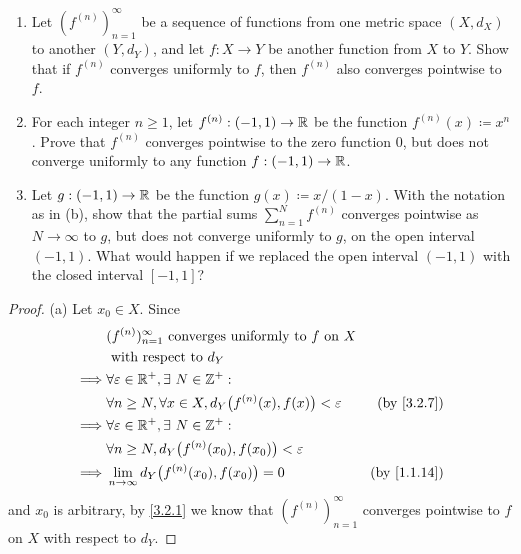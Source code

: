 \begin{ex}\label{ex:3.2.2}
  \quad
  \begin{enumerate}
    \item Let \((f^{(n)})_{n = 1}^\infty\) be a sequence of functions from one metric space \((X, d_X)\) to another \((Y, d_Y)\), and let \(f : X \to Y\) be another function from \(X\) to \(Y\).
          Show that if \(f^{(n)}\) converges uniformly to \(f\), then \(f^{(n)}\) also converges pointwise to \(f\).
    \item For each integer \(n \geq 1\), let \(f^{(n)} : (-1, 1) \to \mathbb{R}\) be the function \(f^{(n)}(x) \coloneqq x^n\).
          Prove that \(f^{(n)}\) converges pointwise to the zero function \(0\), but does not converge uniformly to any function \(f : (-1, 1) \to \mathbb{R}\).
    \item Let \(g : (-1, 1) \to \mathbb{R}\) be the function \(g(x) \coloneqq x / (1 - x)\).
          With the notation as in (b), show that the partial sums \(\sum_{n = 1}^N f^{(n)}\) converges pointwise as \(N \to \infty\) to \(g\), but does not converge uniformly to \(g\), on the open interval \((-1, 1)\).
          What would happen if we replaced the open interval \((-1, 1)\) with the closed interval \([-1, 1]\)?
  \end{enumerate}
\end{ex}

\begin{proof}{(a)}
  Let \(x_0 \in X\).
  Since
  \begin{align*}
             & (f^{(n)})_{n = 1}^\infty \text{ converges uniformly to } f \text{ on } X                                   \\
             & \text{ with respect to } d_Y                                                                               \\
    \implies & \forall \varepsilon \in \R^+, \exists\ N \in \Z^+ :                                                        \\
             & \forall n \geq N, \forall x \in X, d_Y\big(f^{(n)}(x), f(x)\big) < \varepsilon & \text{(by \cref{3.2.7})}  \\
    \implies & \forall \varepsilon \in \R^+, \exists\ N \in \Z^+ :                                                        \\
             & \forall n \geq N, d_Y\big(f^{(n)}(x_0), f(x_0)\big) < \varepsilon                                          \\
    \implies & \lim_{n \to \infty} d_Y\big(f^{(n)}(x_0), f(x_0)\big) = 0                      & \text{(by \cref{1.1.14})}
  \end{align*}
  and \(x_0\) is arbitrary, by \cref{3.2.1} we know that \((f^{(n)})_{n = 1}^\infty\) converges pointwise to \(f\) on \(X\) with respect to \(d_Y\).
\end{proof}


